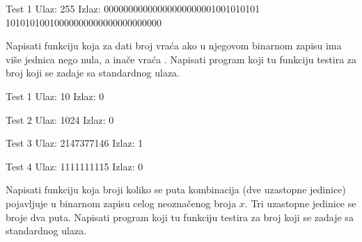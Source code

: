 \begin{Exercise}[label=004]
\begin{Exercise}[label=206]
\begin{maxitest}
\begin{test}{Test 1}
Ulaz:  255   
Izlaz:  
  00000000000000000000001001010101
  10101010010000000000000000000000
\end{test}
\end{maxitest}

\end{Exercise}
\begin{Answer}[ref=206]
\end{Answer}


\begin{Exercise}[label=207]
Napisati funkciju  koja za dati broj  vraća  ako u njegovom binarnom zapisu ima više jednica nego nula, a inače vraća .  Napisati program koji tu funkciju testira za broj koji se zadaje sa standardnog ulaza.

\begin{minitest}
\begin{test}{Test 1}
Ulaz:   10
Izlaz:  0 
\end{test}
\end{minitest}
\begin{minitest}
\begin{test}{Test 2}
Ulaz:   1024
Izlaz:  0 
\end{test}
\end{minitest}
\begin{minitest}
\begin{test}{Test 3}
Ulaz:   2147377146
Izlaz:  1 
\end{test}
\end{minitest}

\begin{minitest}
\begin{test}{Test 4}
Ulaz:   1111111115
Izlaz:  0 
\end{test}
\end{minitest}

\end{Exercise}
\begin{Answer}[ref=207]
\end{Answer}

\begin{Exercise}[label=208]
Napisati funkciju koja broji koliko se puta kombinacija
   (dve uzastopne jedinice) pojavljuje u binarnom zapisu
  celog neoznačenog broja $x$. Tri uzastopne jedinice se broje
  dva puta.  Napisati program koji tu funkciju testira za broj koji se
  zadaje sa standardnog ulaza.
  

\end{Exercise}
\end{Exercise}
